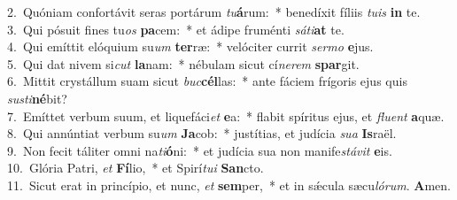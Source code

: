 {2.~}Quóniam confortávit seras portárum \textit{tu}\textbf{á}rum:~* benedíxit fíliis \textit{tu}\textit{is} \textbf{in} te.\\
{3.~}Qui pósuit fines tu\textit{os} \textbf{pa}cem:~* et ádipe fruménti \textit{sá}\textit{ti}\textbf{at} te.\\
{4.~}Qui emíttit elóquium su\textit{um} \textbf{ter}ræ:~* velóciter currit \textit{ser}\textit{mo} \textbf{e}jus.\\
{5.~}Qui dat nivem si\textit{cut} \textbf{la}nam:~* nébulam sicut cí\textit{ne}\textit{rem} \textbf{spar}git.\\
{6.~}Mittit crystállum suam sicut \textit{buc}\textbf{cél}las:~* ante fáciem frígoris ejus quis \textit{su}\textit{sti}\textbf{né}bit?\\
{7.~}Emíttet verbum suum, et liquefáci\textit{et} \textbf{e}a:~* flabit spíritus ejus, et \textit{flu}\textit{ent} \textbf{a}quæ.\\
{8.~}Qui annúntiat verbum su\textit{um} \textbf{Ja}cob:~* justítias, et judícia \textit{su}\textit{a} \textbf{Is}raël.\\
{9.~}Non fecit táliter omni na\textit{ti}\textbf{ó}ni:~* et judícia sua non manife\textit{stá}\textit{vit} \textbf{e}is.\\
{10.~}Glória Patri, \textit{et} \textbf{Fí}lio,~* et Spirí\textit{tu}\textit{i} \textbf{San}cto.\\
{11.~}Sicut erat in princípio, et nunc, \textit{et} \textbf{sem}per,~* et in sǽcula sæcu\textit{ló}\textit{rum}. \textbf{A}men.\\
